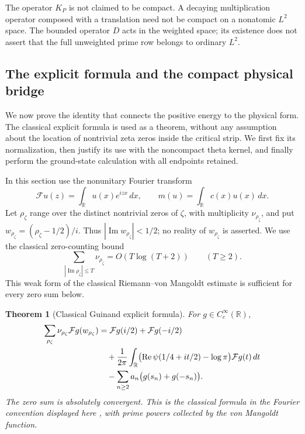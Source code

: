 \documentclass[11pt,a4paper]{article}
\numberwithin{equation}{section}
\newtheorem{theorem}{Theorem}[section]
\theoremstyle{definition}\newtheorem{definition}[theorem]{Definition}
\theoremstyle{remark}\newtheorem{remark}[theorem]{Remark}
\newcommand{\R}{\mathbb R}\newcommand{\C}{\mathbb C}\newcommand{\N}{\mathbb N}
\begin{document}
The operator $K_P$ is not claimed to be compact. A decaying multiplication operator composed with a translation need not be compact on a nonatomic $L^2$ space. The bounded operator $D$ acts in the weighted space; its existence does not assert that the full unweighted prime row belongs to ordinary $L^2$.


\subsection{The explicit formula and the compact physical bridge}\label{a:sec:bridge}

We now prove the identity that connects the positive energy to the physical form. The classical explicit formula is used as a theorem, without any assumption about the location of nontrivial zeta zeros inside the critical strip. We first fix its normalization, then justify its use with the noncompact theta kernel, and finally perform the ground-state calculation with all endpoints retained.

In this section use the nonunitary Fourier transform
\[
 \mathcal Fu(z)=\int_\R u(x)e^{izx}\,dx,
 \qquad m(u)=\int_\R c(x)u(x)\,dx.
\]
Let $\rho_\zeta$ range over the distinct nontrivial zeros of $\zeta$, with multiplicity $\nu_{\rho_\zeta}$, and put $w_{\rho_\zeta}=(\rho_\zeta-1/2)/i$. Thus $|\operatorname{Im}w_{\rho_\zeta}|<1/2$; no reality of $w_{\rho_\zeta}$ is asserted. We use the classical zero-counting bound
\begin{equation}\label{a:eq:zerocount}
 \sum_{|\operatorname{Im}\rho_\zeta|\le T}\nu_{\rho_\zeta}
       =O(T\log(T+2))\qquad(T\ge2).
\end{equation}
This weak form of the classical Riemann--von Mangoldt estimate \cite{vonMangoldt} is sufficient for every zero sum below.

\begin{theorem}[Classical Guinand explicit formula]\label{a:thm:guinand}
For $g\in C_c^\infty(\R)$,
\begin{align}\label{a:eq:guinand}
 \sum_{\rho_\zeta}\nu_{\rho_\zeta}\mathcal Fg(w_{\rho_\zeta})
 &=\mathcal Fg(i/2)+\mathcal Fg(-i/2)\notag\\
 &\quad+\frac1{2\pi}\int_\R
   \bigl(\operatorname{Re}\psi(1/4+it/2)-\log\pi\bigr)
       \mathcal Fg(t)\,dt\notag\\
 &\quad-\sum_{n\ge2}a_n\bigl(g(s_n)+g(-s_n)\bigr).
\end{align}
The zero sum is absolutely convergent. This is the classical formula in the Fourier convention displayed here \cite{Guinand}, with prime powers collected by the von Mangoldt function.
\end{theorem}
\end{document}
